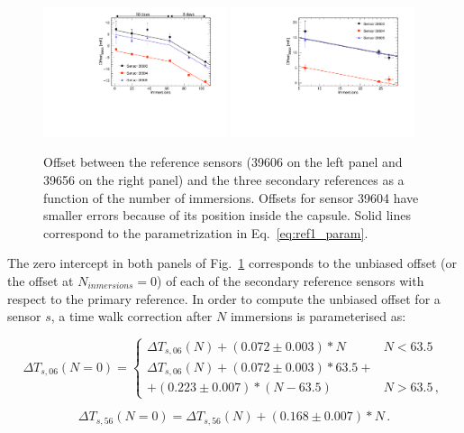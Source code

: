 \begin{figure}[htbp]
\centering
{\includegraphics[width=0.48\textwidth]{images/figure_12_a.pdf}}
{\includegraphics[width=0.48\textwidth]{images/figure_12_b.pdf}}
\caption{Offset between the reference sensors (39606 on the left panel and 39656 on the right panel) and the three secondary references as a function of the number of immersions. Offsets for sensor 39604 have smaller errors because of its position inside the capsule. Solid lines correspond to the parametrization in Eq.~\ref{eq:ref1_param}.}
\label{fig:offset_ref}
\end{figure}

The zero intercept in both panels of Fig.~\ref{fig:offset_ref} corresponds to the unbiased offset (or the offset at $N_{inmersions}=0$) of each of the secondary reference sensors with respect to the primary reference. In order to compute the unbiased offset for a sensor $s$, a time walk correction after $N$ immersions is parameterised as:

\begin{equation}
\Delta T_{s,06}(N=0)=
    \begin{cases}
        \Delta T_{s,06}(N)+(0.072\pm0.003)*N                             & N<63.5\\
        \Delta T_{s,06}(N)+(0.072\pm0.003)*63.5+\\+(0.223\pm0.007)*(N-63.5) & N>63.5 \,,
    \end{cases}
    \label{eq:ref1_param}
\end{equation}

\begin{equation}
\Delta T_{s,56}(N=0)=\Delta T_{s,56}(N)+(0.168\pm0.007)*N  \, .
\label{eq:ref2_param}
\end{equation}

